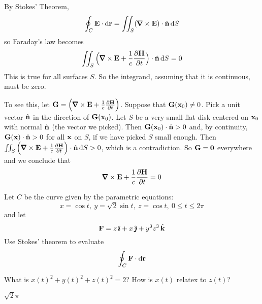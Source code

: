 \begin{solution}
By Stokes' Theorem,
\begin{equation*}
\oint_C\vE\cdot \dee{\vr}=\dblInt_S(\vnabla\times\vE)\cdot \hn\,\dee{S}
\end{equation*}
so Faraday's law becomes 
\begin{equation*}
\dblInt_S\Big(\vnabla\times\vE
+\frac{1}{c}\frac{\partial\vH}{\partial t}\Big)\cdot\hn\,\dee{S}=0
\end{equation*}
This is true for all surfaces $S$. So the integrand, assuming that it is
continuous,  must be zero. 

To see this, let 
$\vG=\Big(\vnabla\times\vE+\frac{1}{c}\frac{\partial\vH}{\partial t}\Big)$.
Suppose that $\mathbf{G}(\mathbf{x}_0)\ne 0$. Pick a unit vector $\hat{\mathbf{n}}$ in the direction
of $\mathbf{G}(\mathbf{x}_0)$. Let $S$ be a very small flat disk centered on $\mathbf{x}_0$
with normal $\hat{\mathbf{n}}$ (the vector we picked). Then $\mathbf{G}(\mathbf{x}_0)\cdot\hat{\mathbf{n}}>0$
and, by continuity, $\mathbf{G}(\mathbf{x})\cdot\hat{\mathbf{n}}>0$ for all $\mathbf{x}$ on $S$, if we have
picked $S$ small enough.
 Then $\dblInt_S\Big(\vnabla\times\vE
    +\frac{1}{c}\frac{\partial\vH}{\partial t}\Big)\cdot \hn\,\dee{S}>0$, which is a contradiction.
So $\mathbf{G}=\mathbf{0}$ everywhere and we conclude that
\begin{equation*}
\vnabla\times\vE+\frac{1}{c}\frac{\partial\vH}{\partial t}=0
\end{equation*}
\end{solution}

\begin{question}[M317 2004A] %
Let $C$ be the curve given by the parametric equations:
\begin{equation*}
x=\cos t,\ 
y=\sqrt{2}\sin t,\ 
z=\cos t,\ 
0\le t\le 2\pi
\end{equation*}
and let
\begin{equation*}
\mathbf{F}=z\,\hat{\pmb{\imath}}+x\,\hat{\pmb{\jmath}}+y^3z^3\,\hat{\mathbf{k}}
\end{equation*}
Use Stokes' theorem to evaluate 
\begin{equation*}
\oint_C \mathbf{F}\cdot \mathrm{d}\mathbf{r}
\end{equation*}
\end{question}

\begin{hint} 
What is $x(t)^2+y(t)^2+z(t)^2=2$? How is $x(t)$
relatex to $z(t)$?
\end{hint}

\begin{answer} 
$\sqrt{2}\pi$
\end{answer}


